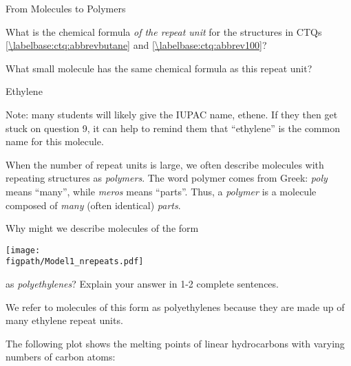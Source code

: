 \begin{activity}{From Molecules to Polymers}
\begin{ctqs}
	\question What is the chemical formula \emph{of the repeat unit} for the structures in CTQs \ref{\labelbase:ctq:abbrevbutane} and \ref{\labelbase:ctq:abbrev100}?
		
		\begin{solution}[0.75in]{}
		\end{solution}
	
	\question What small molecule has the same chemical formula as this repeat unit?
		
		\begin{solution}[0.75in]{}
			Ethylene
			
			Note: many students will likely give the IUPAC name, ethene.  If they then get stuck on question 9, it can help to remind them that ``ethylene'' is the common name for this molecule.
		\end{solution}
	
\end{ctqs}

\begin{infobox}
	When the number of repeat units is large, we often describe molecules with repeating structures as \emph{polymers}.  The word polymer comes from Greek: \emph{poly} means ``many'', while \emph{meros} means ``parts''.  Thus, a \emph{polymer} is a molecule composed of \emph{many} (often identical) \emph{parts}.
\end{infobox}

\begin{ctqs}
	\question Why might we describe molecules of the form
	
		\centerline{\texttt{[image: \\figpath/Model1\_nrepeats.pdf]}}
			
		as \emph{polyethylenes}?  Explain your answer in 1-2 complete sentences.
		
		\begin{solution}[2in]{}
			We refer to molecules of this form as polyethylenes because they are made up of many ethylene repeat units.
		\end{solution}
\end{ctqs}

\clearpage
\begin{model}
	\label{\labelbase:mdl:hydrocarbonmelting}

	The following plot shows the melting points of linear hydrocarbons with varying numbers of carbon atoms:
	
	\vspace{6pt}
	

\end{model}
\end{activity}
